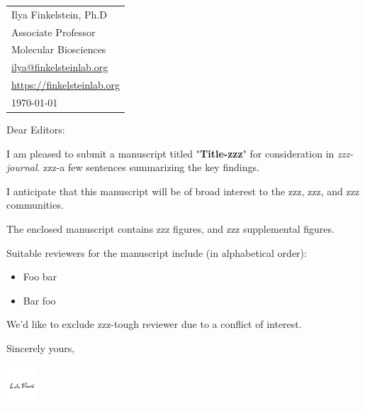\documentclass{article}
\begin{document}
\hfill
\begin{tabular}{l @{}}
\\
Ilya Finkelstein, Ph.D                 \\
Associate Professor                  \\
Molecular Biosciences                \\
\href{mailto:ilya@finkelsteinlab.org}{ilya@finkelsteinlab.org}              \\
  \url{https://finkelsteinlab.org} \bigskip \\
  
	\today  %
\end{tabular}

\bigskip %




Dear Editors:

\bigskip %

I am pleased to submit a manuscript titled "\textbf{Title-zzz}" for consideration in \emph{zzz-journal}. zzz-a few sentences summarizing the key findings. 

I anticipate that this manuscript will be of broad interest to the zzz, zzz, and zzz communities.

The enclosed manuscript contains zzz figures, and zzz supplemental figures.

Suitable reviewers for the manuscript include (in alphabetical order): 

\begin{itemize}
\item Foo bar
\item Bar foo
\end{itemize}

We’d like to exclude zzz-tough reviewer due to a conflict of interest.


\bigskip %

Sincerely yours,

\includegraphics[height = 1.5cm]{signature.pdf}
\end{document}
